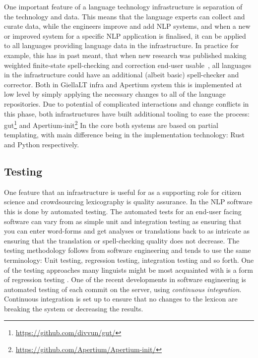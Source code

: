 \documentclass[free]{flammie}
\begin{document}
One important feature of a language technology infrastructure is separation of the technology and data.
This means that the language experts can collect and curate data, while the engineers improve and add NLP systems, and when a new or improved system for a specific NLP application is finalised, it can be applied to all languages providing language data in the infrastructure.
In practice for example, this has in past meant, that when new research was published making weighted finite-state spell-checking and correction end-user usable~\cite{pirinen2014state}, all languages in the infrastructure could have an additional (albeit basic) spell-checker and corrector.
Both in GiellaLT infra and Apertium system this is implemented at low level by simply applying the necessary changes to all of the language repositories.
Due to potential of complicated interactions and change conflicts in this phase, both infrastructures have built additional tooling to ease the process: gut\footnote{\url{https://github.com/divvun/gut/}} and Apertium-init\footnote{\url{https://github.com/Apertium/Apertium-init/}}
In the core both systems are based on partial templating, with main difference being in the implementation technology: Rust and Python respectively.

\subsection{Testing}

One feature that an infrastructure is useful for as a supporting role for citizen science and crowdsourcing lexicography is quality assurance.
In the NLP software this is done by automated testing.
The automated tests for an end-user facing software can vary from as simple unit and integration testing as ensuring that you can enter word-forms and get analyses or translations back to as intricate as ensuring that the translation or spell-checking quality does not decrease.
The testing methodology follows from software engineering and tends to use the same terminology: Unit testing, regression testing, integration testing and so forth.
One of the testing approaches many linguists might be most acquainted with is a form of regression testing \cite{bender2007validation}.
One of the recent developments in software engineering is automated testing of each commit on the server, using \textit{continuous integration}.
Continuous integration is set up to ensure that no changes to the lexicon are breaking the system or decreasing the results.
\end{document}

